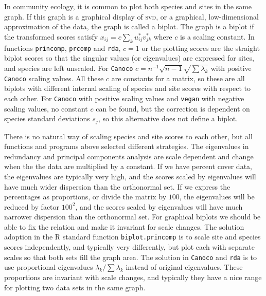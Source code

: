 \documentclass[a4paper,10pt]{amsart}
\begin{document}
In community ecology, it is common to plot both species and sites in
the same graph.  If this graph is a graphical display of \textsc{svd},
or a graphical, low-dimensional approximation of the data, the graph
is called a biplot.  The graph is a biplot if the transformed scores
satisfy $x_{ij} = c \sum_k u_{ij}^* v_{jk}^*$ where $c$ is a scaling
constant.  In functions \texttt{princomp}, \texttt{prcomp} and
\texttt{rda}, $c=1$ or the plotting scores are the straight biplot
scores so that the singular values (or eigenvalues) are expressed for
sites, and species are left unscaled.  For \texttt{Canoco} $c = n^{-1}
\sqrt{n-1} \sqrt{\sum \lambda_k}$ with positive \texttt{Canoco}
scaling values. All these $c$ are constants for a matrix, so these are
all biplots with different internal scaling of species and site scores
with respect to each other.  For \texttt{Canoco} with positive scaling
values and \texttt{vegan} with negative scaling values, no constant
$c$ can be found, but the correction is dependent on species standard
deviations $s_j$, so this alternative does not define a biplot.

There is no natural way of scaling species and site scores to each
other, but all functions and programs above selected different
strategies.  The eigenvalues in redundancy and principal components
analysis are scale dependent and change when the the data are
multiplied by a constant.  If we have percent cover data, the
eigenvalues are typically very high, and the scores scaled by
eigenvalues will have much wider dispersion than the orthonormal set.
If we express the percentages as proportions, or divide the matrix by
$100$, the eigenvalues will be reduced by factor $100^2$, and the
scores scaled by eigenvalues will have much narrower dispersion than
the orthonormal set.  For graphical biplots we should be able to fix
the relation and make it invariant for scale changes.  The solution
adoption in the R standard function \texttt{biplot.princomp} is to
scale site and species scores independently, and typically very
differently, but plot each with separate scales so that both sets fill
the graph area.  The solution in \texttt{Canoco} and \texttt{rda} is
to use proportional eigenvalues $\lambda_k / \sum \lambda_k$ instead
of original eigenvalues.  These proportions are invariant with scale
changes, and typically they have a nice range for plotting two data
sets in the same graph.
\end{document}
